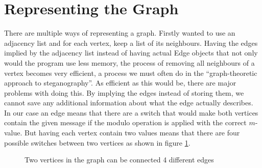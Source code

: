 \section{Representing the Graph}
There are multiple ways of representing a graph. Firstly wanted to use an adjacency list and for each vertex, keep a list of its neighbours. Having the edges implied by the adjacency list instead of having actual Edge objects that not only would the program use less memory, the process of removing all neighbours of a vertex becomes very efficient, a process we must often do in the ``graph-theoretic approach to steganography''. As efficient as this would be, there are major problems with doing this. By implying the edges instead of storing them, we cannot save any additional information about what the edge actually describes. In our case an edge means that there are a switch that would make both vertices contain the given message if the modulo operation is applied with the correct $m$-value. But having each vertex contain two values means that there are four possible switches between two vertices as shown in figure \ref{fig:graphSwitches}.

\begin{figure}
\begin {center}
\end{center}
\caption{Two vertices in the graph can be connected 4 different edges}
\label{fig:graphSwitches}
\end{figure}

